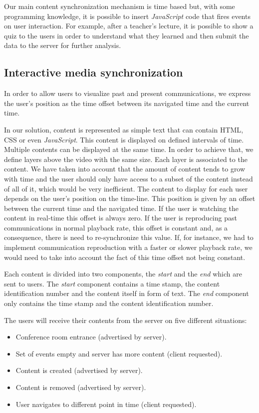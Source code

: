 	Our main content synchronization mechanism is time based but, with some programming knowledge, it is possible to insert \emph{JavaScript} code that fires events on user interaction. For example, after a teacher's lecture, it is possible to show a quiz to the users in order to understand what they learned and then submit the data to the server for further analysis.


	\subsection{Interactive media synchronization}

	In order to allow users to visualize past and present communications, we express the user's position as the time offset between its navigated time and the current time.


	In our solution, content is represented as simple text that can contain \ac{HTML}, \ac{CSS} or even \emph{JavaScript}. This content is displayed on defined intervals of time. Multiple contents can be displayed at the same time. In order to achieve that, we define layers above the video with the same size. Each layer is associated to the content.	We have taken into account that the amount of content tends to grow with time and the user should only have access to a subset of the content instead of all of it, which would be very inefficient. The content to display for each user depends on the user's position on the time-line. This position is given by an offset between the current time and the navigated time. If the user is watching the content in real-time this offset is always zero. If the user is reproducing past communications in normal playback rate, this offset is constant and, as a consequence, there is need to re-synchronize this value. If, for instance, we had to implement communication reproduction with a faster or slower playback rate, we would need to take into account the fact of this time offset not being constant. 

	Each content is divided into two components, the \emph{start} and the \emph{end} which are sent to users. The \emph{start} component contains a time stamp, the content identification number and the content itself in form of text. The \emph{end} component only contains the time stamp and the content identification number. 

	The users will receive their contents from the server on five different situations:

	\begin{itemize}
		\item Conference room entrance (advertised by server).
		\item Set of events empty and server has more content (client requested).
		\item Content is created (advertised by server).
		\item Content is removed (advertised by server).
		\item User navigates to different point in time (client requested).
	\end{itemize}


